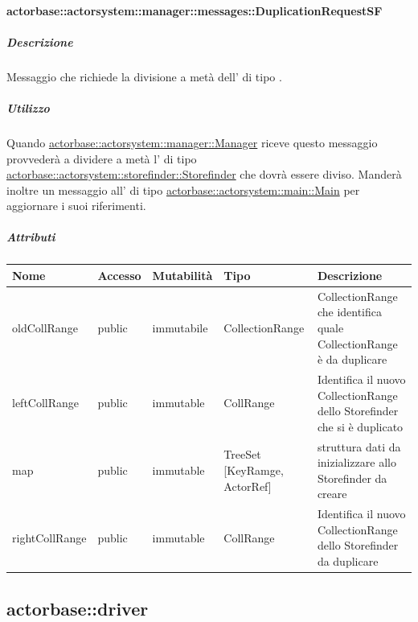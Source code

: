 \documentclass{scalatekids-article}
\begin{document}
\paragraph{actorbase::actorsystem::manager::messages::DuplicationRequestSF}
\label{sec:actorbase::actorsystem::manager::messages::DuplicationRequestSF}

\subparagraph{Descrizione}

Messaggio che richiede la divisione a metà dell' di tipo
.

\subparagraph{Utilizzo}

Quando \hyperref[sec:actorbase::actorsystem::manager::Manager]{actorbase::\allowbreak{}actorsystem::\allowbreak{}manager::\allowbreak{}Manager}
riceve questo messaggio provvederà a dividere a metà l' di tipo
\hyperref[sec:actorbase::actorsystem::storefinder::Storefinder]{actorbase::\allowbreak{}actorsystem::\allowbreak{}storefinder::\allowbreak{}Storefinder}
che dovrà essere diviso. Manderà inoltre un messaggio all' di tipo
\hyperref[sec:actorbase::actorsystem::main::Main]{actorbase::\allowbreak{}actorsystem::\allowbreak{}main::\allowbreak{}Main}
per aggiornare i suoi riferimenti.

\subparagraph{Attributi}
\begin{tabular}{| p{3cm} | p{1.5cm} | p{2cm} | p{2cm} | p{8.5cm} |}
  \hline
  Nome & Accesso & Mutabilità & Tipo & Descrizione \\
  \hline
  oldCollRange & public & immutabile & CollectionRange & CollectionRange che identifica quale CollectionRange è da duplicare \\
  \hline
  leftCollRange & public & immutable & CollRange & Identifica il nuovo CollectionRange dello Storefinder che si è duplicato \\
  \hline
  map & public & immutable & TreeSet [KeyRamge, ActorRef] & struttura dati da inizializzare allo Storefinder da creare\\
  \hline
  rightCollRange & public & immutable & CollRange & Identifica il nuovo CollectionRange dello Storefinder da duplicare \\
  \hline
\end{tabular}


\subsection{actorbase::driver}
\label{sec:actorbase::driver}
\end{document}
